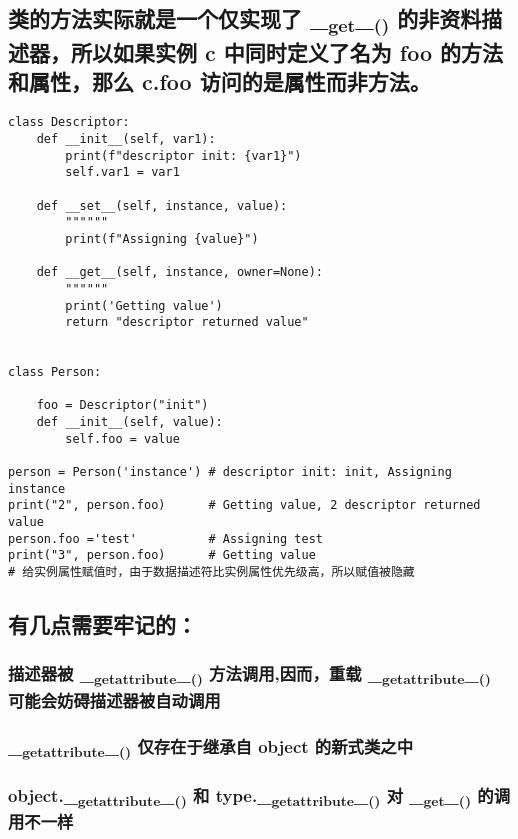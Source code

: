 \documentclass[11pt]{article}
\begin{document}
\subsection{类的方法实际就是一个仅实现了 \_\textsubscript{get}\_\textsubscript{()} 的非资料描述器，所以如果实例 c 中同时定义了名为 foo 的方法和属性，那么 c.foo 访问的是属性而非方法。}
\label{sec:org617dd3a}

\begin{verbatim}
class Descriptor:
    def __init__(self, var1):
        print(f"descriptor init: {var1}")
        self.var1 = var1

    def __set__(self, instance, value):
        """"""
        print(f"Assigning {value}")

    def __get__(self, instance, owner=None):
        """"""
        print('Getting value')
        return "descriptor returned value"


class Person:

    foo = Descriptor("init")
    def __init__(self, value):
        self.foo = value

person = Person('instance') # descriptor init: init, Assigning instance
print("2", person.foo)      # Getting value, 2 descriptor returned value
person.foo ='test'          # Assigning test
print("3", person.foo)      # Getting value
# 给实例属性赋值时，由于数据描述符比实例属性优先级高，所以赋值被隐藏
\end{verbatim}
\subsection{有几点需要牢记的：}
\label{sec:org023ba1a}
\subsubsection{描述器被 \_\textsubscript{getattribute}\_\textsubscript{()} 方法调用,因而，重载 \_\textsubscript{getattribute}\_\textsubscript{()} 可能会妨碍描述器被自动调用}
\label{sec:orgce1df0f}
\subsubsection{\_\textsubscript{getattribute}\_\textsubscript{()} 仅存在于继承自 object 的新式类之中}
\label{sec:org9bd454e}
\subsubsection{object.\_\textsubscript{getattribute}\_\textsubscript{()} 和 type.\_\textsubscript{getattribute}\_\textsubscript{()} 对 \_\textsubscript{get}\_\textsubscript{()} 的调用不一样}
\label{sec:org22f2863}
\end{document}
